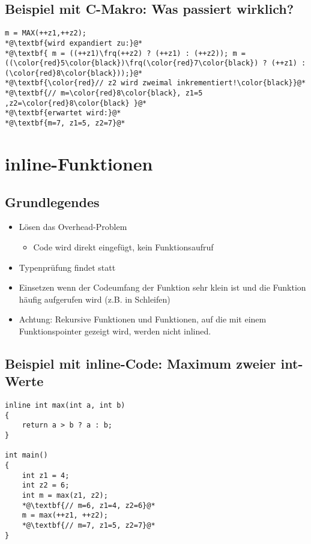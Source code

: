 \subsection{Beispiel mit C-Makro: Was passiert wirklich?}
\label{sec:Beispiel mit C-Makro: Was passiert wirklich?}
\noindent
\begin{minipage}{\linewidth}
\begin{lstlisting}
m = MAX(++z1,++z2);
*@\textbf{wird expandiert zu:}@*
*@\textbf{ m = ((++z1)\frq(++z2) ? (++z1) : (++z2)); m = ((\color{red}5\color{black})\frq(\color{red}7\color{black}) ? (++z1) : (\color{red}8\color{black}));}@*
*@\textbf{\color{red}// z2 wird zweimal inkrementiert!\color{black}}@*
*@\textbf{// m=\color{red}8\color{black}, z1=5 ,z2=\color{red}8\color{black} }@*
*@\textbf{erwartet wird:}@*
*@\textbf{m=7, z1=5, z2=7}@*
\end{lstlisting}
\end{minipage}


\section{inline-Funktionen}
\label{sec:inline-Funktionen}

\subsection{Grundlegendes}
\label{sec:inline-Funktionen: Grundlegendes}
\begin{itemize}
	\item Lösen das Overhead-Problem
	\begin{itemize}
		\item Code wird direkt eingefügt, kein Funktionsaufruf
	\end{itemize}
	\item Typenprüfung findet statt
	\item Einsetzen wenn der Codeumfang der Funktion sehr klein ist und die Funktion häufig aufgerufen wird (z.B. in Schleifen)
	\item Achtung: Rekursive Funktionen und Funktionen, auf die mit einem Funktionspointer gezeigt wird, werden nicht inlined.
\end{itemize}

\subsection{Beispiel mit inline-Code: Maximum zweier int-Werte}
\label{sec:Beispiel mit inline-Code: Maximum zweier int-Werte}
\noindent
\begin{minipage}{\linewidth}
\begin{lstlisting}
inline int max(int a, int b)
{
	return a > b ? a : b;
}

int main()
{
	int z1 = 4;
	int z2 = 6;
	int m = max(z1, z2);
	*@\textbf{// m=6, z1=4, z2=6}@*
	m = max(++z1, ++z2);
	*@\textbf{// m=7, z1=5, z2=7}@*
}
\end{lstlisting}
\end{minipage}

